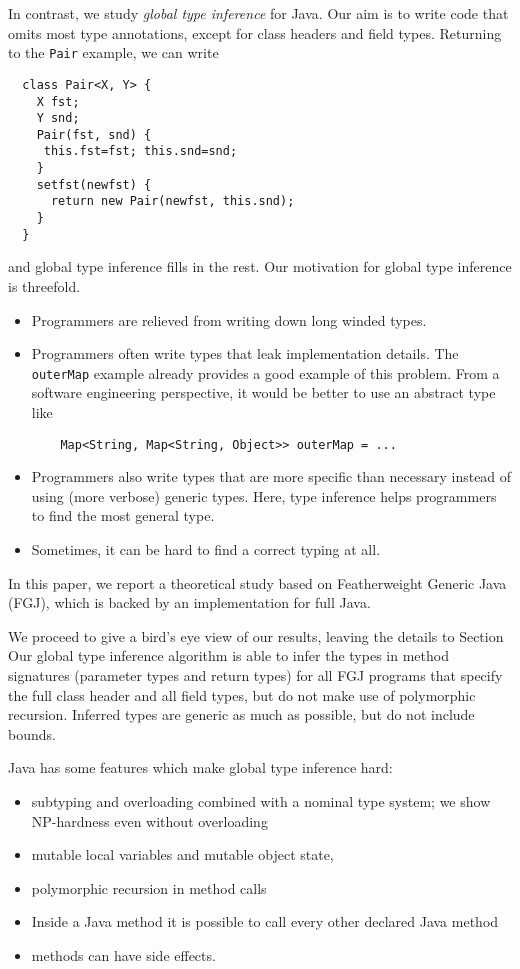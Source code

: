In contrast, we study \emph{global type inference} for Java. Our aim
is to write code that omits most type annotations, except for class
headers and field types. Returning to the \lstinline{Pair} example, we
can write
\begin{lstlisting}
  class Pair<X, Y> {
    X fst;
    Y snd;
    Pair(fst, snd) {
     this.fst=fst; this.snd=snd;
    }
    setfst(newfst) {
      return new Pair(newfst, this.snd);
    }
  }  
\end{lstlisting}
and global type inference fills in the rest. Our motivation for global
type inference is threefold.
\begin{itemize}
\item Programmers are relieved from writing down long winded types. 
\item Programmers often write types that leak implementation details. The
  \lstinline{outerMap} example already provides a good example of this
  problem. From a software engineering
  perspective, it would be better to use an abstract type like
  \begin{lstlisting}
    Map<String, Map<String, Object>> outerMap = ...
  \end{lstlisting}
\item Programmers also write types that are more specific than
  necessary instead of using (more verbose) generic types. Here, type
  inference helps programmers to find the most general type.
\item Sometimes, it can be hard to find a correct typing at all.
\end{itemize}

In this paper, we report a theoretical study based on Featherweight
Generic Java \cite{DBLP:journals/toplas/IgarashiPW01} (FGJ), which is backed
by an implementation for full Java.

We proceed to give a bird's eye view of our results, leaving the
details to Section
Our global type inference algorithm is able to infer the types in
method signatures (parameter types and return types) for all
FGJ programs that specify the full class header and all field types,
but do not make use of polymorphic recursion.
Inferred types are generic as much as possible, but do not include bounds.


Java has some features which make global type inference hard:
\begin{itemize}
\item subtyping and overloading combined with a nominal type system;
  we show NP-hardness even without overloading
\item mutable local variables and mutable object state,
\item polymorphic recursion in method calls
\item Inside a Java method it is possible to call every other declared Java method
\item methods can have side effects.
\end{itemize}



